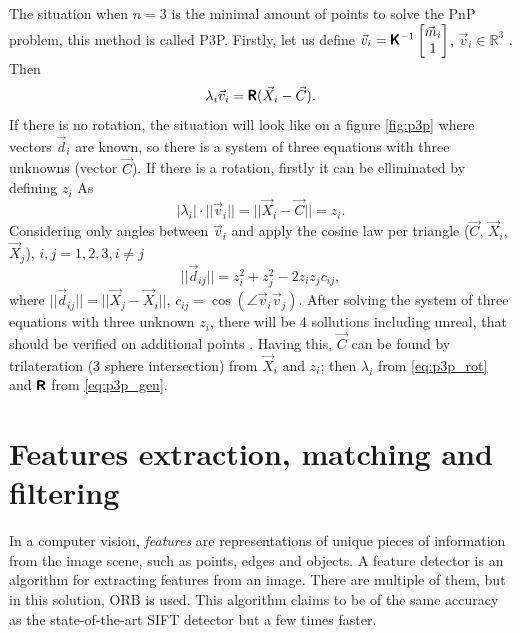 The situation when $n=3$ is the minimal amount of points to solve the PnP problem, this method is called P3P.  
Firstly, let us define $\vec{v}_i = \pmb{\mathsf{K}}^{-1}\begin{bmatrix}\vec{m}_i \\ 1 \end{bmatrix}$, $\vec{v}_i \in \mathbb{R}^3$ . Then
\begin{equation}
    \label{eq:p3p_gen}
    \lambda_i \vec{v}_i = \pmb{\mathsf{R}} (\vec{X}_i - \vec{C}).
\end{equation}
If there is no rotation, the situation will look like on a figure \autoref{fig:p3p} where vectors $\vec{d}_i$ are known, so there is a system of three equations with three unknowns (vector $\vec{C}$).
If there is a rotation, firstly it can be elliminated by defining $z_i$ As
\begin{equation}
    \label{eq:p3p_rot}
    |\lambda_i| \cdot ||\vec{v}_i|| = || \vec{X}_i - \vec{C} || = z_i.
\end{equation}
Considering only angles between $\vec{v}_i$ and apply the cosine law per triangle ($\vec{C}$, $\vec{X}_i$, $\vec{X}_j$), $i, j = 1, 2, 3, i \neq j$
\begin{equation}
    ||\vec{d}_{ij}|| = z_i^2 + z_j^2 - 2z_iz_jc_{ij},
\end{equation}
where $||\vec{d}_{ij}|| = || \vec{X}_j - \vec{X}_i ||$, $c_{ij} = \cos(\angle \vec{v}_i \vec{v}_j)$.
After solving the system of three equations with three unknown $z_i$, there will be 4 sollutions including unreal, that should be verified on additional points \cite{Fischler1981}.
Having this, $\vec{C}$ can be found by trilateration (3 sphere intersection) from $\vec{X}_i$ and $z_i$; then $\lambda_i$ from \eqref{eq:p3p_rot} and $\pmb{\mathsf{R}}$ from \eqref{eq:p3p_gen}.

\section{Features extraction, matching and filtering}
\label{sec:features}
In a computer vision, \textit{features} are representations of unique pieces of information from the image scene, such as points, edges and objects.
A feature detector is an algorithm for extracting features from an image.
There are multiple of them, but in this solution, ORB \cite{Rublee2011} is used. 
This algorithm claims to be of the same accuracy as the state-of-the-art SIFT detector but a few times faster. 


